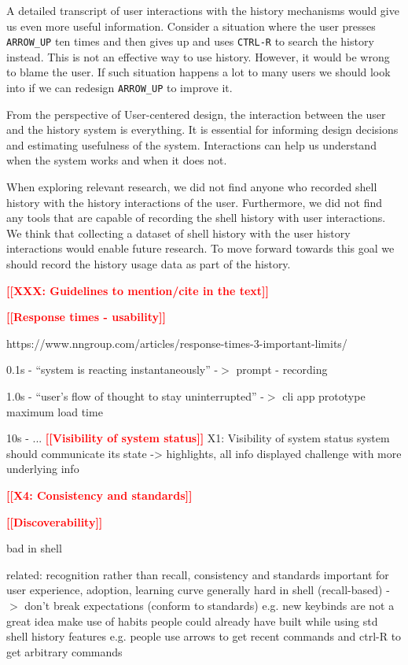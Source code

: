 \documentclass[thesis=M,english]{FITthesis}[2012/10/20]
\newcommand{\todotext}[1]{\textcolor{red}{\textbf{[[#1]]}}}
\begin{document}
A detailed transcript of user interactions with the history mechanisms would give us even more useful information. Consider a situation where the user presses \verb|ARROW_UP| ten times and then gives up and uses \verb|CTRL-R| to search the history instead. This is not an effective way to use history. However, it would be wrong to blame the user. If such situation happens a lot to many users we should look into if we can redesign \verb|ARROW_UP| to improve it.

From the perspective of User-centered design, the interaction between the user and the history system is everything. It is essential for informing design decisions and estimating usefulness of the system. Interactions can help us understand when the system works and when it does not.
 
When exploring relevant research, we did not find anyone who recorded shell history with the history interactions of the user. Furthermore, we did not find any tools that are capable of recording the shell history with user interactions. We think that collecting a dataset of shell history with the user history interactions would enable future research. To move forward towards this goal we should record the history usage data as part of the history.



\todotext{XXX: Guidelines to mention/cite in the text}

\todotext{Response times - usability}

https://www.nngroup.com/articles/response-times-3-important-limits/

0.1s - “system is reacting instantaneously” -$>$ prompt - recording

1.0s - “user's flow of thought to stay uninterrupted” -$>$ cli app prototype maximum load time

10s - ...
\todotext{Visibility of system status}
X1: Visibility of system status
system should communicate its state -> highlights, all info displayed
challenge with more underlying info

\todotext{X4: Consistency and standards}

\todotext{Discoverability}

bad in shell

related: recognition rather than recall, consistency and standards
important for user experience, adoption, learning curve
generally hard in shell (recall-based)
-$>$ don’t break expectations (conform to standards)
e.g. new keybinds are not a great idea
make use of habits people could already have built while using std shell history features
e.g. people use arrows to get recent commands and ctrl-R to get arbitrary commands
\end{document}
